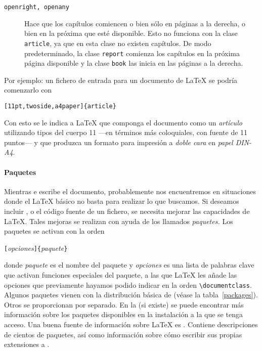 \begin{table}[!bp]
\begin{lined}{12cm}
\begin{flushleft}
\begin{description}
\item[\normalfont\texttt{openright,  openany}]  \quad   Hace  que  los
capítulos comiencen  o bien sólo  en páginas a  la derecha, o  bien en
la  próxima  que  esté  disponible.  Esto no  funciona  con  la  clase
\texttt{article}, ya que  en esta clase no existen  capítulos. De modo
predeterminado, la clase \texttt{report}  comienza los capítulos en la
próxima página disponible  y la clase \texttt{book} las  inicia en las
páginas a la derecha.

\end{description}
\end{flushleft}
\end{lined}
\end{table}

Por ejemplo:  un fichero de entrada  para un documento de  \LaTeX{} se
podría comenzarlo con

\begin{code}
\verb|[11pt,twoside,a4paper]{article}|
\end{code}

Con esto  se le indica  a \LaTeX{} que  componga el documento  como un
\emph{artículo}  utilizando tipos  del  cuerpo 11  ---en términos  más
coloquiales, con fuente de 11 puntos--- y que produzca un formato para
impresión a \emph{doble cara} en \emph{papel DIN-A4}.

\pagebreak[2]  \paragraph{Paquetes}   Mientras e
escribe el  documento, probablemente  nos encuentremos  en situaciones
donde el  \LaTeX{} básico no basta  para realizar lo que  buscamos. Si
deseamos incluir ,  o el código fuente
de un  fichero, se necesita  mejorar las capacidades de  \LaTeX. Tales
mejoras se  realizan con  ayuda de  los llamados  \emph{paquetes.} Los
paquetes se activan con la orden

\begin{command}
\verb|[|\emph{opciones}\verb|]{|\emph{paquete}\verb|}|
\end{command}

\noindent   donde  \emph{paquete}   es   el  nombre   del  paquete   y
\emph{opciones} es una  lista de palabras clave  que activan funciones
especiales del paquete, a las que  \LaTeX{} les añade las opciones que
previamente hayamos podido indicar  en la orden \verb|\documentclass|.
Algunos paquetes vienen con la distribución básica de \LaTeXe{} (véase
la tabla~\ref{packages}).  Otros se  proporcionan por separado.  En la
\guia{}  (si existe)  se  puede encontrar  más  información sobre  los
paquetes disponibles en  la instalación a la que se  tenga acceso. Una
buena  fuente de  información sobre  \LaTeX{} es  \companion. Contiene
descripciones de cientos de paquetes,  así como información sobre cómo
escribir sus propias extensiones a \LaTeXe.

